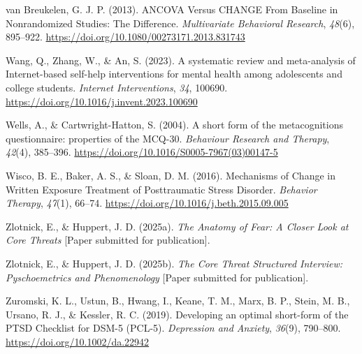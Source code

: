 \documentclass[
  man,floatsintext]{apa7}
\newlength{\cslhangindent}
\newlength{\cslentryspacingunit} %
\newenvironment{CSLReferences}[2] %
 {%
  \setlength{\parindent}{0pt}
  \ifodd #1
  \let\oldpar\par
  \def\par{\hangindent=\cslhangindent\oldpar}
  \fi
  \setlength{\parskip}{#2\cslentryspacingunit}
 }%
 {}
\begin{document}
\begin{CSLReferences}{1}{0}
\leavevmode{}%
van Breukelen, G. J. P. (2013). ANCOVA Versus CHANGE From Baseline in Nonrandomized Studies: The Difference. \emph{Multivariate Behavioral Research}, \emph{48}(6), 895--922. \url{https://doi.org/10.1080/00273171.2013.831743}

\leavevmode{}%
Wang, Q., Zhang, W., \& An, S. (2023). A systematic review and meta-analysis of Internet-based self-help interventions for mental health among adolescents and college students. \emph{Internet Interventions}, \emph{34}, 100690. \url{https://doi.org/10.1016/j.invent.2023.100690}

\leavevmode{}%
Wells, A., \& Cartwright-Hatton, S. (2004). A short form of the metacognitions questionnaire: properties of the MCQ-30. \emph{Behaviour Research and Therapy}, \emph{42}(4), 385--396. \url{https://doi.org/10.1016/S0005-7967(03)00147-5}

\leavevmode{}%
Wisco, B. E., Baker, A. S., \& Sloan, D. M. (2016). Mechanisms of Change in Written Exposure Treatment of Posttraumatic Stress Disorder. \emph{Behavior Therapy}, \emph{47}(1), 66--74. \url{https://doi.org/10.1016/j.beth.2015.09.005}

\leavevmode{}%
Zlotnick, E., \& Huppert, J. D. (2025a). \emph{The Anatomy of Fear: A Closer Look at Core Threats} {[}Paper submitted for publication{]}.

\leavevmode{}%
Zlotnick, E., \& Huppert, J. D. (2025b). \emph{The Core Threat Structured Interview: Pyschoemetrics and Phenomenology} {[}Paper submitted for publication{]}.

\leavevmode{}%
Zuromski, K. L., Ustun, B., Hwang, I., Keane, T. M., Marx, B. P., Stein, M. B., Ursano, R. J., \& Kessler, R. C. (2019). Developing an optimal short-form of the PTSD Checklist for DSM-5 (PCL-5). \emph{Depression and Anxiety}, \emph{36}(9), 790--800. \url{https://doi.org/10.1002/da.22942}

\end{CSLReferences}
\end{document}
